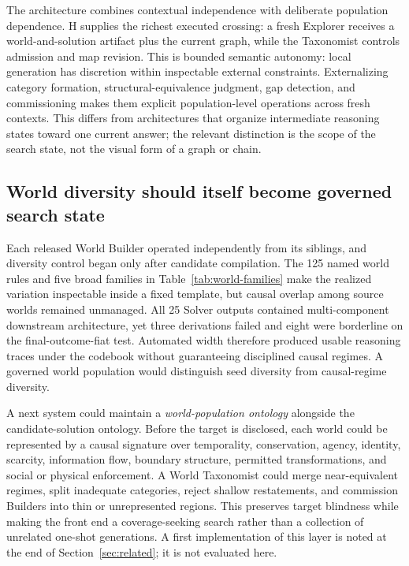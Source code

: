\documentclass[11pt,a4paper]{article}
\begin{document}
The architecture combines contextual independence with deliberate population dependence. H supplies the richest executed crossing: a fresh Explorer receives a world-and-solution artifact plus the current graph, while the Taxonomist controls admission and map revision. This is bounded semantic autonomy: local generation has discretion within inspectable external constraints. Externalizing category formation, structural-equivalence judgment, gap detection, and commissioning makes them explicit population-level operations across fresh contexts. This differs from architectures that organize intermediate reasoning states toward one current answer; the relevant distinction is the scope of the search state, not the visual form of a graph or chain.

\subsection{World diversity should itself become governed search state}
\label{sec:world-governed}

Each released World Builder operated independently from its siblings, and diversity control began only after candidate compilation. The 125 named world rules and five broad families in Table~\ref{tab:world-families} make the realized variation inspectable inside a fixed template, but causal overlap among source worlds remained unmanaged. All 25 Solver outputs contained multi-component downstream architecture, yet three derivations failed and eight were borderline on the final-outcome-fiat test. Automated width therefore produced usable reasoning traces under the codebook without guaranteeing disciplined causal regimes. A governed world population would distinguish seed diversity from causal-regime diversity.

A next system could maintain a \emph{world-population ontology} alongside the candidate-solution ontology. Before the target is disclosed, each world could be represented by a causal signature over temporality, conservation, agency, identity, scarcity, information flow, boundary structure, permitted transformations, and social or physical enforcement. A World Taxonomist could merge near-equivalent regimes, split inadequate categories, reject shallow restatements, and commission Builders into thin or unrepresented regions. This preserves target blindness while making the front end a coverage-seeking search rather than a collection of unrelated one-shot generations. A first implementation of this layer is noted at the end of Section~\ref{sec:related}; it is not evaluated here.
\end{document}
